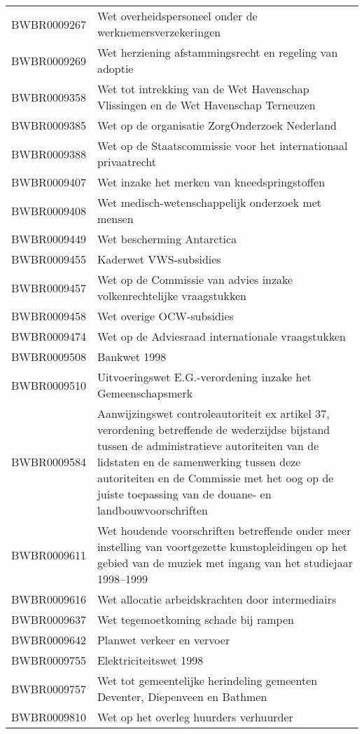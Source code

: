 \begin{longtable}{lp{}}
BWBR0009267 & Wet overheidspersoneel onder de werknemersverzekeringen \\
BWBR0009269 & Wet herziening afstammingsrecht en regeling van adoptie \\
BWBR0009358 & Wet tot intrekking van de Wet Havenschap Vlissingen en de Wet Havenschap Terneuzen \\
BWBR0009385 & Wet op de organisatie ZorgOnderzoek Nederland \\
BWBR0009388 & Wet op de Staatscommissie voor het internationaal privaatrecht \\
BWBR0009407 & Wet inzake het merken van kneedspringstoffen \\
BWBR0009408 & Wet medisch-wetenschappelijk onderzoek met mensen \\
BWBR0009449 & Wet bescherming Antarctica \\
BWBR0009455 & Kaderwet VWS-subsidies \\
BWBR0009457 & Wet op de Commissie van advies inzake volkenrechtelijke vraagstukken \\
BWBR0009458 & Wet overige OCW-subsidies \\
BWBR0009474 & Wet op de Adviesraad internationale vraagstukken \\
BWBR0009508 & Bankwet 1998 \\
BWBR0009510 & Uitvoeringswet E.G.-verordening inzake het Gemeenschapsmerk \\
BWBR0009584 & Aanwijzingswet controleautoriteit ex artikel 37, verordening betreffende de wederzijdse bijstand tussen de administratieve autoriteiten van de lidstaten en de samenwerking tussen deze autoriteiten en de Commissie met het oog op de juiste toepassing van de douane- en landbouwvoorschriften \\
BWBR0009611 & Wet houdende voorschriften betreffende onder meer instelling van voortgezette kunstopleidingen op het gebied van de muziek met ingang van het studiejaar 1998–1999 \\
BWBR0009616 & Wet allocatie arbeidskrachten door intermediairs \\
BWBR0009637 & Wet tegemoetkoming schade bij rampen \\
BWBR0009642 & Planwet verkeer en vervoer \\
BWBR0009755 & Elektriciteitswet 1998 \\
BWBR0009757 & Wet tot gemeentelijke herindeling gemeenten Deventer, Diepenveen en Bathmen \\
BWBR0009810 & Wet op het overleg huurders verhuurder \\

\end{longtable}
